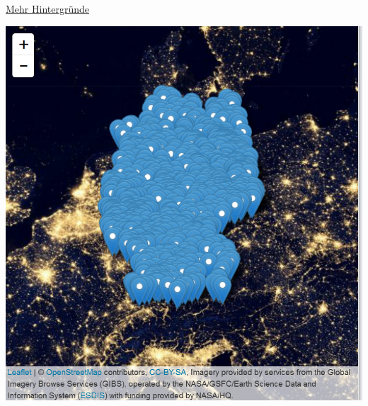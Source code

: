 \documentclass[ignorenonframetext,]{beamer}
\newenvironment{Shaded}{\begin{snugshade}}{\end{snugshade}}
\newcommand{\KeywordTok}[1]{\textcolor[rgb]{0.13,0.29,0.53}{\textbf{#1}}}
\newcommand{\StringTok}[1]{\textcolor[rgb]{0.31,0.60,0.02}{#1}}
\newcommand{\OperatorTok}[1]{\textcolor[rgb]{0.81,0.36,0.00}{\textbf{#1}}}
\newcommand{\NormalTok}[1]{#1}
\begin{document}
\begin{frame}[fragile]{\href{http://leaflet-extras.github.io/leaflet-providers/preview/index.html}{Mehr
Hintergründe}}

\begin{Shaded}
\end{Shaded}

\includegraphics{figure/LightsInteractive.PNG}

\end{frame}
\end{document}
